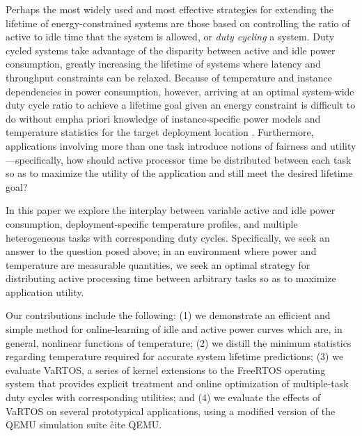 Perhaps the most widely used and most effective strategies for extending the lifetime of energy-constrained systems are those based on controlling the ratio of active to idle time that the system is allowed, or \emph{duty cycling} a system.  Duty cycled systems take advantage of the disparity between active and idle power consumption, greatly increasing the lifetime of systems where latency and throughput constraints can be relaxed. Because of temperature and instance dependencies in power consumption, however, arriving at an optimal system-wide duty cycle ratio to achieve a lifetime goal given an energy constraint is difficult to do without emph{a priori} knowledge of instance-specific power models and temperature statistics for the target deployment location \cite{wanner2010}. Furthermore, applications involving more than one task introduce notions of fairness and utility---specifically, how should active processor time be distributed between each task so as to maximize the utility of the application and still meet the desired lifetime goal?

In this paper we explore the interplay between variable active and idle power consumption, deployment-specific temperature profiles, and multiple heterogeneous tasks with corresponding duty cycles. Specifically, we seek an answer to the question posed above; in an environment where power and temperature are measurable quantities, we seek an optimal strategy for distributing active processing time between arbitrary tasks so as to maximize application utility.  

Our contributions include the following: (1) we demonstrate an efficient and simple method for online-learning of idle and active power curves which are, in general, nonlinear functions of temperature; (2) we distill the minimum statistics regarding temperature required for accurate system lifetime predictions; (3) we evaluate VaRTOS, a series of kernel extensions to the FreeRTOS operating system that provides explicit treatment and online optimization of multiple-task duty cycles with corresponding utilities; and (4) we evaluate the effects of VaRTOS on several prototypical applications, using a modified version of the QEMU simulation suite \r{cite QEMU}.   



